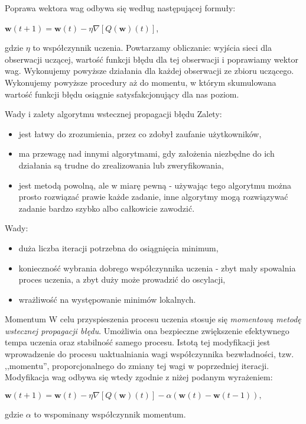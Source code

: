 \documentclass[a4paper,10pt]{beamer}
\begin{document}
		\begin{frame}
			Poprawa wektora wag odbywa się według następującej formuły:
			\begin{center}
				$\mathbf{w}(t+1)=\mathbf{w}(t)-\eta \nabla [Q(\mathbf{w})(t)]$, 
			\end{center}
			gdzie $\eta$ to współczynnik uczenia. Powtarzamy obliczanie:  wyjścia sieci dla obserwacji uczącej, wartość funkcji błędu dla tej obserwacji i poprawiamy wektor wag. Wykonujemy powyższe działania dla każdej obserwacji ze zbioru uczącego. Wykonujemy powyższe procedury aż do momentu, w którym skumulowana wartość funkcji błędu osiągnie satysfakcjonujący dla nas poziom.
		\end{frame}
		\begin{frame}{Wady i zalety algorytmu wstecznej propagacji błędu}
			Zalety:
			\begin{itemize}
				\item jest łatwy do zrozumienia, przez co zdobył zaufanie użytkowników,
				\item ma przewagę nad innymi algorytmami, gdy założenia niezbędne do ich działania są trudne do zrealizowania lub zweryfikowania,
				\item jest metodą powolną, ale w miarę pewną - używając tego algorytmu można prosto rozwiązać prawie każde zadanie, inne algorytmy mogą rozwiązywać zadanie bardzo szybko albo całkowicie zawodzić. 
			\end{itemize}
		\end{frame}
		\begin{frame}
			Wady:
			\begin{itemize}
			\item duża liczba iteracji potrzebna do osiągnięcia minimum,
			\item konieczność wybrania dobrego współczynnika uczenia - zbyt mały spowalnia proces uczenia, a zbyt duży może prowadzić do oscylacji,
			\item wrażliwość na występowanie minimów lokalnych.
			\end{itemize}
		\end{frame}
		\begin{frame}{Momentum}
			W celu przyspieszenia procesu uczenia stosuje się \emph{momentową metodę wstecznej propagacji błędu}. Umożliwia ona bezpieczne zwiększenie efektywnego tempa uczenia oraz stabilność samego procesu. Istotą tej modyfikacji jest wprowadzenie do procesu uaktualniania wagi współczynnika bezwładności, tzw. ,,momentu'', proporcjonalnego do zmiany tej wagi w poprzedniej iteracji. Modyfikacja wag odbywa się wtedy zgodnie z niżej podanym wyrażeniem:
			\begin{center}
				$\mathbf{w}(t+1)=\mathbf{w}(t)-\eta \nabla [Q(\mathbf{w})(t)] -\alpha(\mathbf{w}(t)-\mathbf{w}(t-1)),$
			\end{center}
			gdzie $\alpha$ to wspominany współczynnik momentum. 
		\end{frame}
\end{document}
